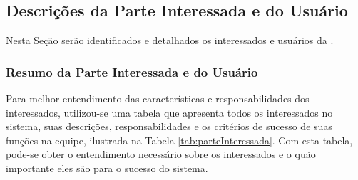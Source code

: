 
\subsection{Descrições da Parte Interessada e do Usuário}

Nesta Seção serão identificados e detalhados os interessados e usuários da \nomeferramenta{}.

\subsubsection{Resumo da Parte Interessada e do Usuário}

Para melhor entendimento das características e responsabilidades dos interessados, utilizou-se uma tabela que apresenta todos os interessados no sistema, suas descrições, responsabilidades e os critérios de sucesso de suas funções na equipe, ilustrada na Tabela \ref{tab:parteInteressada}. Com esta tabela, pode-se obter o entendimento necessário sobre os interessados e o quão importante eles são para o sucesso do sistema.

